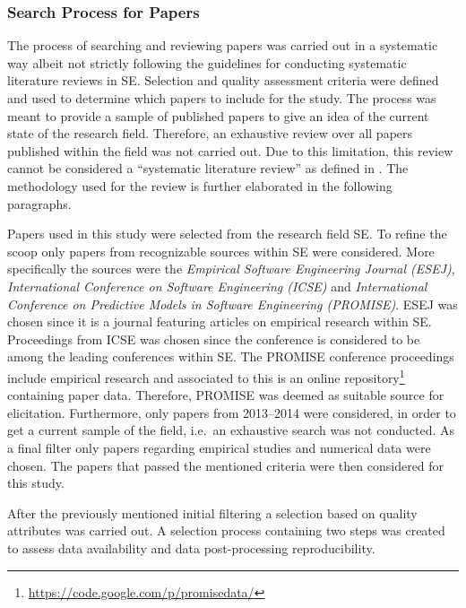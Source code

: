 \subsubsection{Search Process for Papers}
\label{sec:method-paper}




The process of searching and reviewing papers was carried out in a systematic way albeit not strictly following the guidelines for conducting systematic literature reviews in SE. Selection and quality assessment criteria were defined and used to determine which papers to include for the study. The process was meant to provide a sample of published papers to give an idea of the current state of the research field. Therefore, an exhaustive review over all papers published within the field was not carried out. Due to this limitation, this review cannot be considered a ``systematic literature review'' as defined in \citep{kitchenham2007guidelines}. The methodology used for the review is further elaborated in the following paragraphs.


Papers used in this study were selected from the research field SE. To refine the scoop only papers from recognizable sources within SE were considered. More specifically the sources were the \emph{Empirical Software Engineering Journal (ESEJ)}, \emph{International Conference on Software Engineering (ICSE)} and \emph{International Conference on Predictive Models in Software Engineering (PROMISE)}. ESEJ was chosen since it is a journal featuring articles on empirical research within SE. Proceedings from ICSE was chosen since the conference is considered to be among the leading conferences within SE. The PROMISE conference proceedings include empirical research and associated to this is an online repository\footnote{\url{https://code.google.com/p/promisedata/}} containing paper data. Therefore, PROMISE was deemed as suitable source for elicitation. Furthermore, only papers from 2013--2014 were considered, in order to get a current sample of the field, i.e.\ an exhaustive search was not conducted. As a final filter only papers regarding empirical studies and numerical data were chosen. The papers that passed the mentioned criteria were then considered for this study.




After the previously mentioned initial filtering a selection based on quality attributes was carried out. A selection process containing two steps was created to assess data availability and data post-processing reproducibility. 




